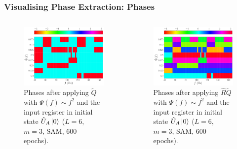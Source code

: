 \documentclass{beamer}
\begin{document}
\begin{frame}
\frametitle{Visualising Phase Extraction: Phases}
\begin{columns}
\begin{column}{0.5\textwidth}
\begin{figure}
\centering 
\includegraphics[width=\textwidth]{im/Q_phase_quadratic_UA}
\caption{Phases after applying $\tilde{Q}$ with $\Psi(f) \sim f^2$ and the input register in initial state $\hat{U}_A \ket{0}$ ($L=6$, $m=3$, SAM, 600 epochs).}
\end{figure}
\end{column}
\begin{column}{0.5\textwidth}
\begin{figure}
\centering 
\includegraphics[width=\textwidth]{im/RQ_phase_quadratic_UA}
\caption{Phases after applying $\hat{R}\tilde{Q}$ with $\Psi(f) \sim f^2$ and the input register in initial state $\hat{U}_A \ket{0}$ ($L=6$, $m=3$, SAM, 600 epochs).}
\end{figure}
\end{column}
\end{columns}
\end{frame}
\end{document}
